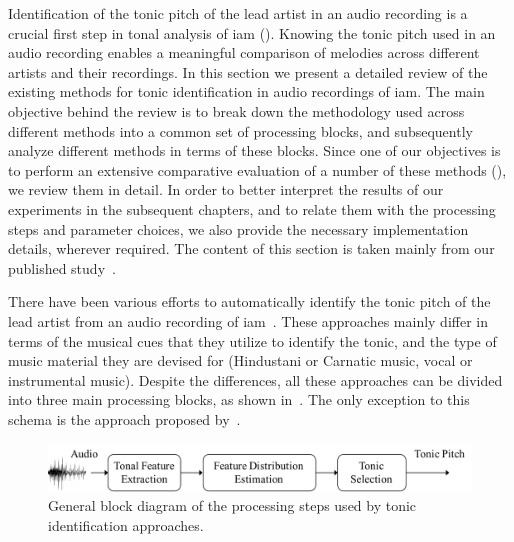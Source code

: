 Identification of the tonic pitch of the lead artist in an audio recording is a crucial first step in tonal analysis of \gls{iam} (). Knowing the tonic pitch used in an audio recording enables a meaningful comparison of melodies across different artists and their recordings. In this section we present a detailed review of the existing methods for tonic identification in audio recordings of \gls{iam}. The main objective behind the review is to break down the methodology used across different methods into a common set of processing blocks, and subsequently analyze different methods in terms of these blocks. Since one of our objectives is to perform an extensive comparative evaluation of a number of these methods (), we review them in detail. In order to better interpret the results of our experiments in the subsequent chapters, and to relate them with the processing steps and parameter choices, we also provide the necessary implementation details, wherever required. The content of this section is taken mainly from our published study~\citep{Gulati2014Tonic}.

There have been various efforts to automatically identify the tonic pitch of the lead artist from an audio recording of \gls{iam}~\citep{salamon2012multipitch,gulati2012two,bellur2012knowledge,ranjani2011carnatic,Sengupta2005b,chordia2013joint}. These approaches mainly differ in terms of the musical cues that they utilize to identify the tonic, and the type of music material they are devised for (Hindustani or Carnatic music, vocal or
instrumental music). Despite the differences, all these approaches can be divided into three main processing blocks, as shown in~. The only exception to this schema is the approach proposed by~\cite{Sengupta2005b}. 

\begin{figure}
	\begin{center}
		\includegraphics[width=\figSizeNinetyFive]{ch02_background/figures/tonic_identification_block_diagram.pdf}
	\end{center}
	\caption[General block diagram of tonic identification approaches]{General block diagram of the processing steps used by tonic identification approaches.}
	\label{fig:tonic_identification_general_block_diagram}
\end{figure}

